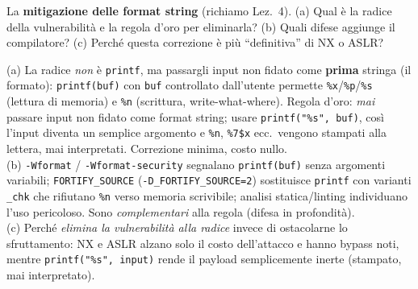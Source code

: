 \question[5]
La \textbf{mitigazione delle format string} (richiamo Lez.\ 4). (a) Qual è la radice della vulnerabilità e la regola d'oro per eliminarla? (b) Quali difese aggiunge il compilatore? (c) Perché questa correzione è più ``definitiva'' di NX o ASLR?
\begin{solution}
(a) La radice \emph{non} è \lstinline|printf|, ma passargli input non fidato come \textbf{prima} stringa (il formato): \lstinline|printf(buf)| con \lstinline|buf| controllato dall'utente permette \lstinline|%x|/\lstinline|%p|/\lstinline|%s| (lettura di memoria) e \lstinline|%n| (scrittura, write-what-where). Regola d'oro: \emph{mai} passare input non fidato come format string; usare \lstinline|printf("%s", buf)|, così l'input diventa un semplice argomento e \lstinline|%n|, \lstinline|%7$x| ecc.\ vengono stampati alla lettera, mai interpretati. Correzione minima, costo nullo.\\
(b) \lstinline|-Wformat| / \lstinline|-Wformat-security| segnalano \lstinline|printf(buf)| senza argomenti variabili; \lstinline|FORTIFY_SOURCE| (\lstinline|-D_FORTIFY_SOURCE=2|) sostituisce \lstinline|printf| con varianti \lstinline|_chk| che rifiutano \lstinline|%n| verso memoria scrivibile; analisi statica/linting individuano l'uso pericoloso. Sono \emph{complementari} alla regola (difesa in profondità).\\
(c) Perché \emph{elimina la vulnerabilità alla radice} invece di ostacolarne lo sfruttamento: NX e ASLR alzano solo il costo dell'attacco e hanno bypass noti, mentre \lstinline|printf("%s", input)| rende il payload semplicemente inerte (stampato, mai interpretato).
\end{solution}
